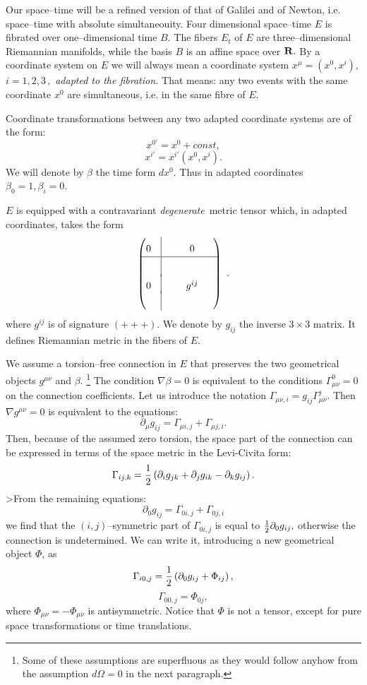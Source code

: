 \documentclass[12pt]{article}
\def\be{\begin{equation}} \def\ee{\end{equation}}
\begin{document}
Our space--time will be a refined version of that of Galilei and
of Newton,  i.e.  space--time with absolute simultaneouity. 
Four dimensional space--time $E$ is fibrated over one--dimensional
time $B . $ The fibers $E_t$ of $E$ are three--dimensional
Riemannian manifolds,  while the basis $B$ is an affine space over
${\bf R} . $ By a coordinate system on $E$ we will always mean a
coordinate system $x^\mu= (x^0, x^i) , $ $i=1, 2, 3\,  , $ {\sl adapted
to the
fibration.}  That means: any two events with the same coordinate $x^0$ are
simultaneous,  i.e.  in the same fibre of $E . $

Coordinate transformations between any two adapted coordinate systems
are of the form: 
$$
x^{0'}=x^0+const , 
$$
$$
x^{i'}=x^{i'}\left (x^0, x^{i}\right) . 
$$
We will denote by $\beta$ the time form $dx^0 . $ Thus in adapted
coordinates $\beta_0=1, \beta_i=0$. 

$E$ is equipped with a contravariant {\sl degenerate}\, metric tensor which,
in adapted coordinates, takes the form
\def\linie{\vrule height 15pt depth 5pt}
\def\back{\noalign{\vskip-3pt}}
$$\begin{pmatrix}0 &\linie & \phantom{0 }& 0 &\phantom{0}\cr
\noalign{\hrule}
&\linie && \cr\back
0 &\linie &  & g^{ij} & 
\cr\back
& \linie && 
\end{pmatrix} \ . $$
where $g^{ij}$ is of signature $ (+++) . $ We denote by $g_{ij}$ the
inverse $3\times 3$ matrix.  It defines Riemannian metric in the
fibers of $E . $

We assume a torsion--free connection in $E$ that preserves
the two geometrical objects $g^{\mu\nu}$ and $\beta$.%
\footnote{Some of these assumptions are superfluous
as they would
follow anyhow from the assumption $d\Omega=0$ in the next
paragraph. }
The condition $\nabla\beta =0$ is equivalent to the conditions 
$\Gamma^0_{\mu\nu}=0$ on the connection coefficients.  Let us
introduce the notation $\Gamma_{\mu\nu, i}=g_{ij}\Gamma^j_{\mu\nu}. $
Then $\nabla g^{\mu\nu}=0$ is equivalent to the equations: 
\be
\partial_\mu g_{ij}=\Gamma_{\mu i, j}+\Gamma_{\mu j, i} . 
\ee
Then,  because of the assumed zero torsion,  the space part of the
connection can be expressed in terms of the space metric in
the Levi-Civita form:
\be
\Gamma_{ij, k}={1\over2}\left ( \partial_i g_{jk}+
\partial_j g_{ik}-
\partial_k g_{ij}\right) . 
\ee
>From the remaining equations:
\be
\partial_0 g_{ij}= \Gamma_{0i, j} + \Gamma_{0j, i} 
\ee
we find that the  $(i,j)$--symmetric part of $\Gamma_{0i, j}$ is equal to
${1\over2}\partial_0 g_{ij} , $ otherwise the connection is
undetermined.  We can write it, introducing a new
geometrical object $\Phi$, as
\be
\Gamma_{i0, j}={1\over2}\left (\partial_0 g_{ij}+\Phi_{ij}\right) , 
\ee
\be
\Gamma_{00, j}=\Phi_{0j} , 
\ee
where $\Phi_{\mu\nu}=-\Phi_{\mu\nu}$ is antisymmetric. Notice
that $\Phi$ is not a tensor, except for pure space transformations
or time translations.
\end{document}
